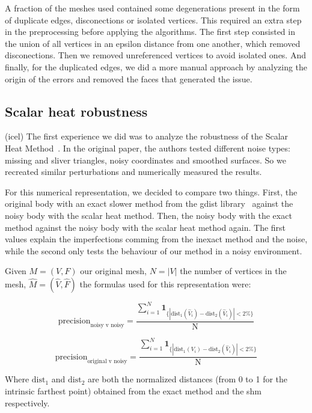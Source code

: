 \documentclass[sigconf]{acmart}
\begin{document}
A fraction of the meshes used contained some degenerations present in the form of duplicate edges, disconections or isolated vertices.
This required an extra step in the preprocessing before applying the algorithms. The first step consisted in the union of all vertices in
an epsilon distance from one another, which removed disconections. Then we removed unreferenced vertices to avoid isolated ones. And finally,
for the duplicated edges, we did a more manual approach by analyzing the origin of the errors and removed the faces that generated the issue. 

\subsection{Scalar heat robustness}
(icel)
The first experience we did was to analyze the robustness of the Scalar Heat Method~\cite{Crane:2017:HMD}. In
the original paper, the authors tested different noise types: missing and sliver triangles,
noisy coordinates and smoothed surfaces. So we recreated similar perturbations and numerically
measured the results.

For this numerical representation, we decided to compare two things. First, the original body
with an exact slower method from the gdist library~\cite{exact_method_algorithm}\cite{exact_method_library}
against the noisy body with the scalar heat method.
Then, the noisy body with the exact method against the noisy body with the scalar heat method again.
The first values explain the imperfections comming from the inexact method and the noise, while
the second only tests the behaviour of our method in a noisy environment.

Given $M = (V, F)$ our original mesh, $N = |V|$ the number of vertices in the mesh, $\hat{M} = (\hat{V}, \hat{F})$ the formulas used for this representation were:

\begin{equation} \label{eq:nvn_precision}
  \text{precision}_{\text{noisy v noisy}} = \frac{\sum_{i=1}^N \mathbf{1}_{\{|\text{dist}_1(\hat{V}_i) - \text{dist}_2(\hat{V}_i)| < 2\%\}}}{\text{N}} 
\end{equation}

\begin{equation} \label{eq:ovn_precision}
  \text{precision}_{\text{original v noisy}} = \frac{\sum_{i=1}^N \mathbf{1}_{\{|\text{dist}_1(V_i) - \text{dist}_2(\hat{V}_i)| < 2\%\}}}{\text{N}} 
\end{equation}

Where $\text{dist}_1$ and $\text{dist}_2$ are both the normalized distances (from 0 to 1 for the intrinsic farthest point) obtained from the exact method and the shm respectively.
\end{document}
